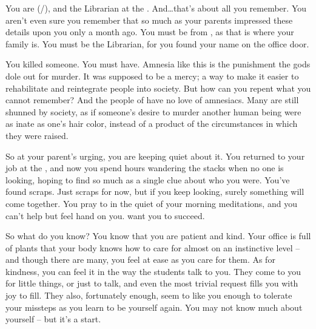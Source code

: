 \documentclass[char]{GL2020}
\begin{document}
\name{\cLibrarian{}}



You are \cLibrarian{} (\cLibrarian{\they}/\cLibrarian{\them}), and the Librarian at the \pSchool{}. And\ldots that’s about all you remember. You aren’t even sure you remember that so much as your parents impressed these details upon you only a month ago. You must be from \pTech{}, as that is where your family is. You must be the Librarian, for you found your name on the office door.

You killed someone. You must have. Amnesia like this is the punishment the gods dole out for murder. It was supposed to be a mercy; a way to make it easier to rehabilitate and reintegrate people into society. But how can you repent what you cannot remember? And the people of \pEarth{} have no love of amnesiacs. Many are still shunned by society, as if someone’s desire to murder another human being were as inate as one’s hair color, instead of a product of the circumstances in which they were raised.

So at your parent’s urging, you are keeping quiet about it. You returned to your job at the \pSchool{}, and now you spend hours wandering the stacks when no one is looking, hoping to find so much as a single clue about who you were. You’ve found scraps. Just scraps for now, but if you keep looking, surely something will come together. You pray to \cTechGod{} in the quiet of your morning meditations, and you can’t help but feel \cTechGod{\their} hand on you. \cTechGod{\They} want you to succeed.

So what do you know? You know that you are patient and kind. Your office is full of plants that your body knows how to care for almost on an instinctive level -- and though there are many, you feel at ease as you care for them. As for kindness, you can feel it in the way the students talk to you. They come to you for little things, or just to talk, and even the most trivial request fills you with joy to fill. They also, fortunately enough, seem to like you enough to tolerate your missteps as you learn to be yourself again. You may not know much about yourself -- but it’s a start.
\end{document}
